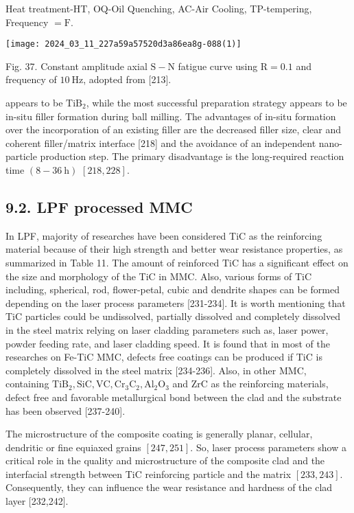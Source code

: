 \documentclass[10pt]{article}
\begin{document}
Heat treatment-HT, OQ-Oil Quenching, AC-Air Cooling, TP-tempering, Frequency $=\mathrm{F}$.

\begin{center}
\texttt{[image: 2024\_03\_11\_227a59a57520d3a86ea8g-088(1)]}
\end{center}

Fig. 37. Constant amplitude axial $\mathrm{S}-\mathrm{N}$ fatigue curve using $\mathrm{R}=0.1$ and frequency of $10 \mathrm{~Hz}$, adopted from [213].

appears to be $\mathrm{TiB}_{2}$, while the most successful preparation strategy appears to be in-situ filler formation during ball milling. The advantages of in-situ formation over the incorporation of an existing filler are the decreased filler size, clear and coherent filler/matrix interface [218] and the avoidance of an independent nano-particle production step. The primary disadvantage is the long-required reaction time $(8-36 \mathrm{~h})$ $[218,228]$.

\subsection*{9.2. LPF processed MMC}
In LPF, majority of researches have been considered TiC as the reinforcing material because of their high strength and better wear resistance properties, as summarized in Table 11. The amount of reinforced $\mathrm{TiC}$ has a significant effect on the size and morphology of the TiC in MMC. Also, various forms of TiC including, spherical, rod, flower-petal, cubic and dendrite shapes can be formed depending on the laser process parameters [231-234]. It is worth mentioning that TiC particles could be undissolved, partially dissolved and completely dissolved in the steel matrix relying on laser cladding parameters such as, laser power, powder feeding rate, and laser cladding speed. It is found that in most of the researches on Fe-TiC MMC, defects free coatings can be produced if TiC is completely dissolved in the steel matrix [234-236]. Also, in other $\mathrm{MMC}$, containing $\mathrm{TiB}_{2}, \mathrm{SiC}, \mathrm{VC}, \mathrm{Cr}_{3} \mathrm{C}_{2}, \mathrm{Al}_{2} \mathrm{O}_{3}$ and $\mathrm{ZrC}$ as the reinforcing materials, defect free and favorable metallurgical bond between the clad and the substrate has been observed [237-240].

The microstructure of the composite coating is generally planar, cellular, dendritic or fine equiaxed grains $[247,251]$. So, laser process parameters show a critical role in the quality and microstructure of the composite clad and the interfacial strength between TiC reinforcing particle and the matrix $[233,243]$. Consequently, they can influence the wear resistance and hardness of the clad layer [232,242].
\end{document}
